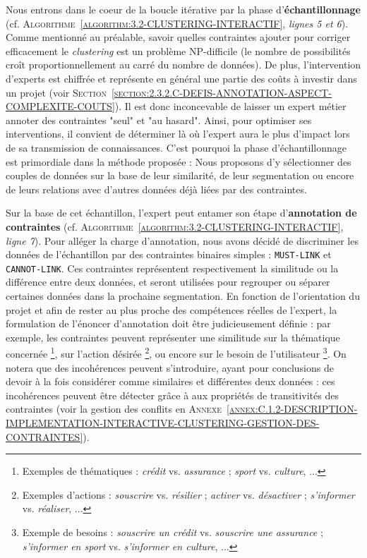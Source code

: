 		Nous entrons dans le coeur de la boucle itérative par la phase d'\textbf{échantillonnage} (cf. \textsc{Algorithme~\ref{algorithm:3.2-CLUSTERING-INTERACTIF}}, \textit{lignes 5 et 6}).
		Comme mentionné au préalable, savoir quelles contraintes ajouter pour corriger efficacement le \textit{clustering} est un problème NP-difficile (le nombre de possibilités croît proportionnellement au carré du nombre de données).
		De plus, l'intervention d'experts est chiffrée et représente en général une partie des coûts à investir dans un projet (voir \textsc{Section~\ref{section:2.3.2.C-DEFIS-ANNOTATION-ASPECT-COMPLEXITE-COUTS}}).
		Il est donc inconcevable de laisser un expert métier annoter des contraintes "seul" et "au hasard".
		Ainsi, pour optimiser ses interventions, il convient de déterminer là où l'expert aura le plus d'impact lors de sa transmission de connaissances.
		C'est pourquoi la phase d'échantillonnage est primordiale dans la méthode proposée : Nous proposons d'y sélectionner des couples de données sur la base de leur similarité, de leur segmentation ou encore de leurs relations avec d'autres données déjà liées par des contraintes.
		
		Sur la base de cet échantillon, l'expert peut entamer son étape d'\textbf{annotation de contraintes} (cf. \textsc{Algorithme~\ref{algorithm:3.2-CLUSTERING-INTERACTIF}}, \textit{ligne 7}).
		Pour alléger la charge d'annotation, nous avons décidé de discriminer les données de l'échantillon par des contraintes binaires simples : \texttt{MUST-LINK} et \texttt{CANNOT-LINK}.
		Ces contraintes représentent respectivement la similitude ou la différence entre deux données, et seront utilisées pour regrouper ou séparer certaines données dans la prochaine segmentation.
		En fonction de l'orientation du projet et afin de rester au plus proche des compétences réelles de l'expert, la formulation de l'énoncer d'annotation doit être judicieusement définie : par exemple, les contraintes peuvent représenter une similitude
		sur la thématique concernée \footnote{
			Exemples de thématiques : \textit{crédit} vs. \textit{assurance} ; \textit{sport} vs. \textit{culture}, ...
		}, sur l'action désirée \footnote{
			Exemples d'actions : \textit{souscrire} vs. \textit{résilier} ; \textit{activer} vs. \textit{désactiver} ; \textit{s'informer} vs. \textit{réaliser}, ...
		}, ou encore sur le besoin de l'utilisateur \footnote{
			Exemple de besoins : \textit{souscrire un crédit} vs. \textit{souscrire une assurance} ; \textit{s'informer en sport} vs. \textit{s'informer en culture}, ...
		}.
		On notera que des incohérences peuvent s'introduire, ayant pour conclusions de devoir à la fois considérer comme similaires et différentes deux données : ces incohérences peuvent être détecter grâce à aux propriétés de transitivités des contraintes (voir la gestion des conflits en \textsc{Annexe~\ref{annex:C.1.2-DESCRIPTION-IMPLEMENTATION-INTERACTIVE-CLUSTERING-GESTION-DES-CONTRAINTES}}).
		
